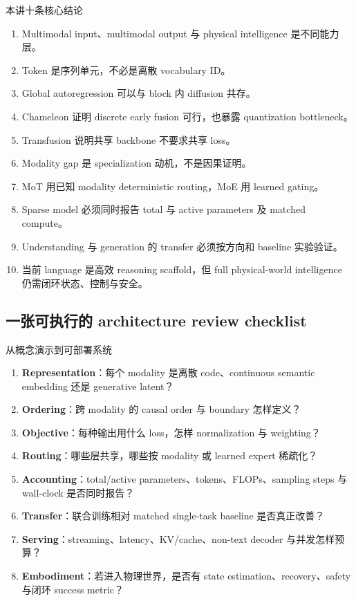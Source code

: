 \documentclass[a4paper]{article}
\begin{document}
\begin{importantbox}{本讲十条核心结论}
\begin{enumerate}
  \item Multimodal input、multimodal output 与 physical intelligence 是不同能力层。
  \item Token 是序列单元，不必是离散 vocabulary ID。
  \item Global autoregression 可以与 block 内 diffusion 共存。
  \item Chameleon 证明 discrete early fusion 可行，也暴露 quantization bottleneck。
  \item Transfusion 说明共享 backbone 不要求共享 loss。
  \item Modality gap 是 specialization 动机，不是因果证明。
  \item MoT 用已知 modality deterministic routing，MoE 用 learned gating。
  \item Sparse model 必须同时报告 total 与 active parameters 及 matched compute。
  \item Understanding 与 generation 的 transfer 必须按方向和 baseline 实验验证。
  \item 当前 language 是高效 reasoning scaffold，但 full physical-world intelligence 仍需闭环状态、控制与安全。
\end{enumerate}
\end{importantbox}

\subsection{一张可执行的 architecture review checklist}

\begin{knowledgebox}{从概念演示到可部署系统}
\begin{enumerate}
  \item \textbf{Representation}：每个 modality 是离散 code、continuous semantic embedding 还是 generative latent？
  \item \textbf{Ordering}：跨 modality 的 causal order 与 boundary 怎样定义？
  \item \textbf{Objective}：每种输出用什么 loss，怎样 normalization 与 weighting？
  \item \textbf{Routing}：哪些层共享，哪些按 modality 或 learned expert 稀疏化？
  \item \textbf{Accounting}：total/active parameters、tokens、FLOPs、sampling steps 与 wall-clock 是否同时报告？
  \item \textbf{Transfer}：联合训练相对 matched single-task baseline 是否真正改善？
  \item \textbf{Serving}：streaming、latency、KV/cache、non-text decoder 与并发怎样预算？
  \item \textbf{Embodiment}：若进入物理世界，是否有 state estimation、recovery、safety 与闭环 success metric？
\end{enumerate}
\end{knowledgebox}
\end{document}
